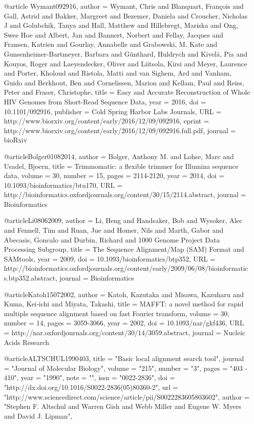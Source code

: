 @article {Wymant092916,
	author = {Wymant, Chris and Blanquart, Fran{\c c}ois and Gall, Astrid and Bakker, Margreet and Bezemer, Daniela and Croucher, Nicholas J and Golubchik, Tanya and Hall, Matthew and Hillebregt, Mariska and Ong, Swee Hoe and Albert, Jan and Bannert, Norbert and Fellay, Jacques and Fransen, Katrien and Gourlay, Annabelle and Grabowski, M. Kate and Gunsenheimer-Bartmeyer, Barbara and G{\"u}nthard, Huldrych and Kivel{\"a}, Pia and Kouyos, Roger and Laeyendecker, Oliver and Liitsola, Kirsi and Meyer, Laurence and Porter, Kholoud and Ristola, Matti and van Sighem, Ard and Vanham, Guido and Berkhout, Ben and Cornelissen, Marion and Kellam, Paul and Reiss, Peter and Fraser, Christophe},
	title = {Easy and Accurate Reconstruction of Whole HIV Genomes from Short-Read Sequence Data},
	year = {2016},
	doi = {10.1101/092916},
	publisher = {Cold Spring Harbor Labs Journals},
	URL = {http://www.biorxiv.org/content/early/2016/12/09/092916},
	eprint = {http://www.biorxiv.org/content/early/2016/12/09/092916.full.pdf},
	journal = {bioRxiv}
}

@article{Bolger01082014,
author = {Bolger, Anthony M. and Lohse, Marc and Usadel, Bjoern}, 
title = {Trimmomatic: a flexible trimmer for Illumina sequence data},
volume = {30}, 
number = {15}, 
pages = {2114-2120}, 
year = {2014}, 
doi = {10.1093/bioinformatics/btu170}, 
URL = {http://bioinformatics.oxfordjournals.org/content/30/15/2114.abstract}, 
journal = {Bioinformatics} 
}

@article{Li08062009,
author = {Li, Heng and Handsaker, Bob and Wysoker, Alec and Fennell, Tim and Ruan, Jue and Homer, Nils and Marth, Gabor and Abecasis, Goncalo and Durbin, Richard and 1000 Genome Project Data Processing Subgroup}, 
title = {The Sequence Alignment/Map (SAM) Format and SAMtools},
year = {2009}, 
doi = {10.1093/bioinformatics/btp352}, 
URL = {http://bioinformatics.oxfordjournals.org/content/early/2009/06/08/bioinformatics.btp352.abstract}, 
journal = {Bioinformatics} 
}

@article{Katoh15072002,
author = {Katoh, Kazutaka and Misawa, Kazuharu and Kuma, Kei‐ichi and Miyata, Takashi}, 
title = {MAFFT: a novel method for rapid multiple sequence alignment based on fast Fourier transform},
volume = {30}, 
number = {14}, 
pages = {3059-3066}, 
year = {2002}, 
doi = {10.1093/nar/gkf436}, 
URL = {http://nar.oxfordjournals.org/content/30/14/3059.abstract}, 
journal = {Nucleic Acids Research} 
}

@article{ALTSCHUL1990403,
title = "Basic local alignment search tool",
journal = "Journal of Molecular Biology",
volume = "215",
number = "3",
pages = "403 - 410",
year = "1990",
note = "",
issn = "0022-2836",
doi = "http://dx.doi.org/10.1016/S0022-2836(05)80360-2",
url = "http://www.sciencedirect.com/science/article/pii/S0022283605803602",
author = "Stephen F. Altschul and Warren Gish and Webb Miller and Eugene W. Myers and David J. Lipman",
}
